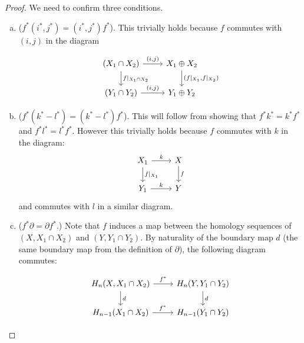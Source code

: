 \begin{proof} 
We need to confirm three conditions.

\begin{enumerate}[(a)]
\item \big($f^*(i^*,j^*)=(i^*,j^*)f^*$\big). This trivially holds because $f$ commutes with $(i,j)$ in the diagram

\[\begin{tikzcd}
(X_1\cap X_2) \arrow[r, "{(i,j)}"] \arrow[d, "f|_{X_1\cap X_2}"] & X_1\dsum X_2 \arrow[d, "{(f|_{X_1},f|_{X_2})}"] \\
(Y_1\cap Y_2) \arrow[r, "{(i,j)}"]                               & Y_1\dsum Y_2                                   
\end{tikzcd}\]

\item \big($f^*(k^*-l^*)=(k^*-l^*)f^*$\big). This will follow from showing that $f^*k^*=k^*f^*$ and $f^*l^*=l^*f^*$. However this trivially holds because $f$ commutes with $k$ in the diagram:
\[\begin{tikzcd}
X_1 \arrow[r, "k"] \arrow[d, "f|_{X_1}"] & X \arrow[d, "f"] \\
Y_1 \arrow[r, "k"]                       & Y               
\end{tikzcd}\]
and commutes with $l$ in a similar diagram.
    \item \big($f^*\partial =\partial f^*$.\big) Note that $f$ induces a map between the homology sequences of $(X,X_1\cap X_2)$ and $(Y,Y_1\cap Y_2)$. By naturality of the boundary map $d$ (the same boundary map from the definition of $\partial$), the following diagram commutes:
    
\[\begin{tikzcd}
{H_n(X,X_1\cap X_2)} \arrow[d, "d"] \arrow[r, "f^*"] & {H_n(Y,Y_1\cap Y_2)} \arrow[d, "d"] \\
H_{n-1}(X_1\cap X_2) \arrow[r, "f^*"]                & H_{n-1}(Y_1\cap Y_2)               
\end{tikzcd}\]


\end{enumerate}
\end{proof}
